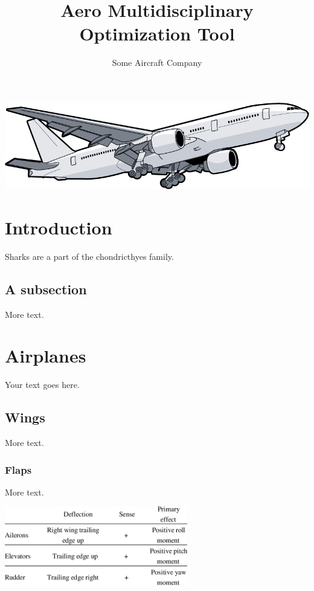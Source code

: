 \documentclass[11pt]{article} %
\title{Aero Multidisciplinary Optimization Tool}
\author{Some Aircraft Company}
\begin{document}
\maketitle
\begin{center}
    \includegraphics[width=1.1\textwidth]{cover}
\end{center}

\pagebreak

\tableofcontents
 
\pagebreak

\section{Introduction}

Sharks are a part of the chondricthyes family.

\subsection{A subsection}

More text.

\section{Airplanes}

Your text goes here.

\subsection{Wings}

More text.

\subsubsection{Flaps}

More text.
\begin{center}
    \includegraphics[width=0.6\textwidth]{cs_sign_conventions}
\end{center}
\end{document}
